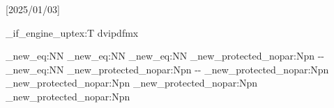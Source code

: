 \RequirePackage{fancyhdr}[2025/01/03]

\sys_if_engine_uptex:T {  {dvipdfmx} }

\cs_new_eq:NN \layoutwidth \Gm@layoutwidth
\cs_new_eq:NN \layoutheight \Gm@layoutheight
\cs_new_eq:NN \layouttoffset \Gm@layoutvoffset 
\cs_new_protected_nopar:Npn \layoutboffset 
  { \dimexpr\paperheight-\Gm@layoutvoffset-\Gm@layoutheight\relax }
\cs_new_eq:NN \layoutloffset \Gm@layouthoffset
\cs_new_protected_nopar:Npn \layoutroffset
  { \dimexpr\paperwidth-\Gm@layouthoffset-\Gm@layoutwidth\relax }
\cs_new_protected_nopar:Npn \bodylmargin { \dimexpr\Gm@lmargin\relax }
\cs_new_protected_nopar:Npn \bodyrmargin { \dimexpr\Gm@rmargin\relax }
\cs_new_protected_nopar:Npn \bodytmargin { \dimexpr\Gm@tmargin\relax }
\cs_new_protected_nopar:Npn \bodybmargin { \dimexpr\Gm@bmargin\relax }

